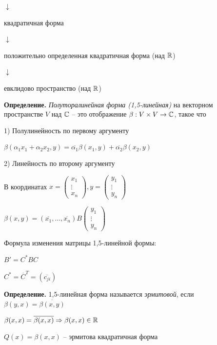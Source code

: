 $\downarrow$

квадратичная форма

$\downarrow$

положительно определенная квадратичная форма (над $\mathbb{R}$)

$\downarrow$

евклидово пространство (над $\mathbb{R}$)

\vspace{\baselineskip}
\textbf{Определение.} \textit{Полуторалинейная форма (1,5-линейная)} на векторном пространстве $V$ над $\mathbb{C}$ -- это отображение $\beta: V \times V \rightarrow \mathbb{C}$, такое что

1) Полулинейность по первому аргументу

$\beta(\alpha_1 x_1 + \alpha_2 x_2, y) = \overline{\alpha_1} \beta (x_1, y) + \overline{\alpha_2} \beta (x_2, y)$

2) Линейность по второму аргументу

\vspace{\baselineskip}
В координатах $x = \begin{pmatrix} x_1 \\ \vdots \\ x_{n} \end{pmatrix}, y = \begin{pmatrix} y_1 \\ \vdots \\ y_{n} \end{pmatrix}$

$\beta(x, y) = (\overline{x_1}, \dots, \overline{x_n}) B \begin{pmatrix} y_1 \\ \vdots \\ y_{n} \end{pmatrix}$

\vspace{\baselineskip}
Формула изменения матрицы 1,5-линейной формы:

$B' = C^* B C$

$C^* = \overline{C}^T = (\overline{c_{ji}})$

\vspace{\baselineskip}
\textbf{Определение.} 1,5-линейная форма называется \textit{эрмитовой}, если $\beta(y, x) = \overline{\beta(x, y)}$

\vspace{\baselineskip}
$\beta(x, x) = \overline{\beta(x, x)} \Rightarrow \beta(x, x) \in \mathbb{R}$

$Q(x) = \beta(x, x)$ -- эрмитова квадратичная форма

